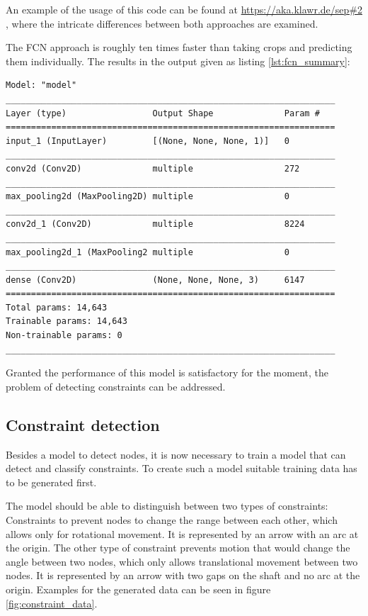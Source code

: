 An example of the usage of this code can be found at \url{https://aka.klawr.de/sep#2} %
, where the intricate differences between both approaches are examined.

The FCN approach is roughly ten times faster than taking crops and predicting them individually. 
The  results in the output given as listing \ref{lst:fcn_summary}:

\begin{lstlisting}[label={lst:fcn_summary}, caption={Summary of Symbol Classifier transformed into a FCN.}]
Model: "model"
_________________________________________________________________
Layer (type)                 Output Shape              Param #   
=================================================================
input_1 (InputLayer)         [(None, None, None, 1)]   0         
_________________________________________________________________
conv2d (Conv2D)              multiple                  272       
_________________________________________________________________
max_pooling2d (MaxPooling2D) multiple                  0         
_________________________________________________________________
conv2d_1 (Conv2D)            multiple                  8224      
_________________________________________________________________
max_pooling2d_1 (MaxPooling2 multiple                  0         
_________________________________________________________________
dense (Conv2D)               (None, None, None, 3)     6147      
=================================================================
Total params: 14,643
Trainable params: 14,643
Non-trainable params: 0
_________________________________________________________________
\end{lstlisting}

Granted the performance of this model is satisfactory for the moment, the problem of detecting constraints can be addressed.

\subsection{Constraint detection}

Besides a model to detect nodes, it is now necessary to train a model that can detect and classify constraints.
To create such a model suitable training data has to be generated first.

The model should be able to distinguish between two types of constraints:
Constraints to prevent nodes to change the range between each other, which allows only for rotational movement.
It is represented by an arrow with an arc at the origin.
The other type of constraint prevents motion that would change the angle between two nodes, which only allows translational movement between two nodes.
It is represented by an arrow with two gaps on the shaft and no arc at the origin.
Examples for the generated data can be seen in figure \ref{fig:constraint_data}.

